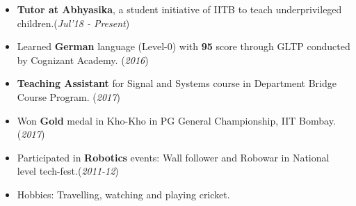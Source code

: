 \documentclass[10pt]{article}
\begin{document}
\begin{itemize}[leftmargin=0.4cm]
\item \textbf{Tutor at Abhyasika}, a student initiative of IITB to teach underprivileged children.\hfill{(\textit{Jul'18 - Present})}\vspace{-0.2cm}
    	
\end{itemize}
\vspace{0.1cm}

\colorbox{bl}{}
\vspace{-0.5cm}
\begin{itemize}[leftmargin=0.4cm]
    \item {Learned \textbf{German} language (Level-0) with \textbf{95} score through GLTP conducted by Cognizant Academy. }\hfill{(\textit{2016})}\vspace{-0.2cm}
    \item \textbf{Teaching Assistant} for Signal and Systems course in Department Bridge Course Program. \hfill{(\textit{2017})}\vspace{-0.2cm}
    \item {Won \textbf{Gold} medal in Kho-Kho in PG General Championship, IIT Bombay.}\hfill{(\textit{2017})}\vspace{-0.2cm}
    \item {Participated in \textbf{Robotics} events: Wall follower and Robowar in National level tech-fest.}\hfill{(\textit{2011-12})}\vspace{-0.2cm}
    \item {Hobbies: Travelling, watching and playing cricket.}

    
\end{itemize}

\end{document}
